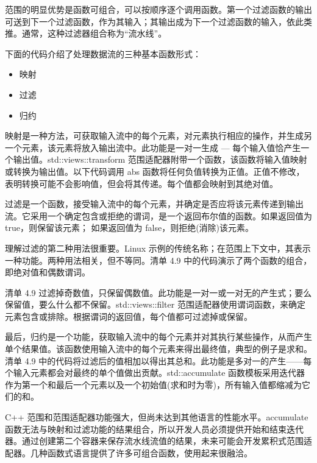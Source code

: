 范围的明显优势是函数可组合，可以按顺序逐个调用函数。第一个过滤函数的输出可送到下一个过滤函数，作为其输入；其输出成为下一个过滤函数的输入，依此类推。通常，这种过滤器组合称为“流水线”。

下面的代码介绍了处理数据流的三种基本函数形式：

\begin{itemize}
\item
映射

\item
过滤

\item
归约
\end{itemize}

映射是一种方法，可获取输入流中的每个元素，对元素执行相应的操作，并生成另一个元素，该元素将放入输出流中。此功能是一对一生成 — 每个输入值恰产生一个输出值。std::views::transform 范围适配器附带一个函数，该函数将输入值映射或转换为输出值。以下代码调用 abs 函数将任何负值转换为正值。正值不修改，表明转换可能不会影响值，但会将其传递。每个值都会映射到其绝对值。

过滤是一个函数，接受输入流中的每个元素，并确定是否应将该元素传递到输出流。它采用一个确定包含或拒绝的谓词，是一个返回布尔值的函数。如果返回值为 true，则保留该元素； 如果返回值为 false，则拒绝(消除)该元素。

理解过滤的第二种用法很重要。Linux 示例的传统名称；在范围上下文中，其表示一种功能。两种用法相关，但不等同。清单 4.9 中的代码演示了两个函数的组合，即绝对值和偶数谓词。

清单 4.9 过滤掉奇数值，只保留偶数值。此功能是一对一或一对无的产生式；要么保留值，要么什么都不保留。std::views::filter 范围适配器使用谓词函数，来确定元素包含或排除。根据谓词的返回值，每个值都可过滤掉或保留。

最后，归约是一个功能，获取输入流中的每个元素并对其执行某些操作，从而产生单个结果值。该函数使用输入流中的每个元素来得出最终值，典型的例子是求和。清单 4.9 中的代码将过滤后的值相加以得出其总和。此功能是多对一的产生——每个输入元素都会对最终的单个值做出贡献。std::accumulate 函数模板采用迭代器作为第一个和最后一个元素以及一个初始值(求和时为零)，所有输入值都缩减为它们的和。

C++ 范围和范围适配器功能强大，但尚未达到其他语言的性能水平。accumulate 函数无法与映射和过滤功能的结果组合，所以开发人员必须提供开始和结束迭代器。通过创建第二个容器来保存流水线流值的结果，未来可能会开发累积式范围适配器。几种函数式语言提供了许多可组合函数，使用起来很融洽。



